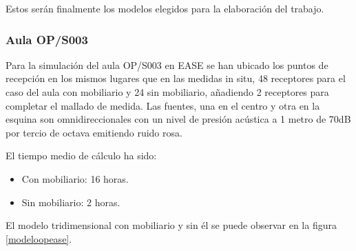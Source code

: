 Estos serán finalmente los modelos elegidos para la elaboración del trabajo.

\subsubsection{Aula OP/S003}

Para la simulación del aula OP/S003 en EASE se han ubicado los puntos de recepción en los mismos lugares que en las medidas in situ, 48 receptores para el caso del aula con mobiliario y 24 sin mobiliario, añadiendo 2 receptores para completar el mallado de medida. Las fuentes, una en el centro y otra en la esquina son omnidireccionales con un nivel de presión acústica a 1 metro de 70dB por tercio de octava emitiendo ruido rosa.


El tiempo medio de cálculo ha sido:
\begin{itemize}
\itemsep0em
  \item Con mobiliario: 16 horas.
  \item Sin mobiliario: 2 horas.
\end{itemize}

El modelo tridimensional con mobiliario y sin él se puede observar en la figura \ref{modeloopease}.


